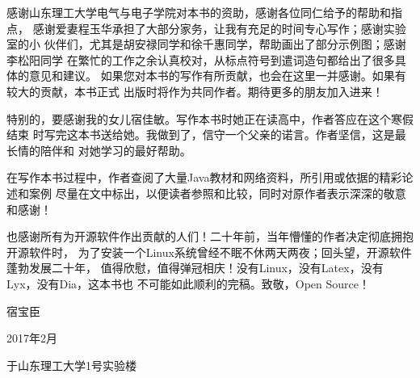 感谢山东理工大学电气与电子学院对本书的资助，感谢各位同仁给予的帮助和指点，
感谢爱妻程玉华承担了大部分家务，让我有充足的时间专心写作；感谢实验室的小
伙伴们，尤其是胡安禄同学和徐千惠同学，帮助画出了部分示例图；感谢李松阳同学
在繁忙的工作之余认真校对，从标点符号到遣词造句都给出了很多具体的意见和建议。
如果您对本书的写作有所贡献，也会在这里一并感谢。如果有较大的贡献，本书正式
出版时将作为共同作者。期待更多的朋友加入进来！

特别的，要感谢我的女儿宿佳敏。写作本书时她正在读高中，作者答应在这个寒假结束
时写完这本书送给她。我做到了，信守一个父亲的诺言。作者坚信，这是最长情的陪伴和
对她学习的最好帮助。

在写作本书过程中，作者查阅了大量Java教材和网络资料，所引用或依据的精彩论述和案例
尽量在文中标出，以便读者参照和比较，同时对原作者表示深深的敬意和感谢！

也感谢所有为开源软件作出贡献的人们！二十年前，当年懵懂的作者决定彻底拥抱开源软件时，
为了安装一个Linux系统曾经不眠不休两天两夜；回头望，开源软件蓬勃发展二十年，
值得欣慰，值得弹冠相庆！没有Linux，没有Latex，没有Lyx，没有Dia，这本书也
不可能如此顺利的完稿。致敬，Open Source！

\hfill 宿宝臣

\hfill 2017年2月

\hfill 于山东理工大学1号实验楼
\mainmatter
